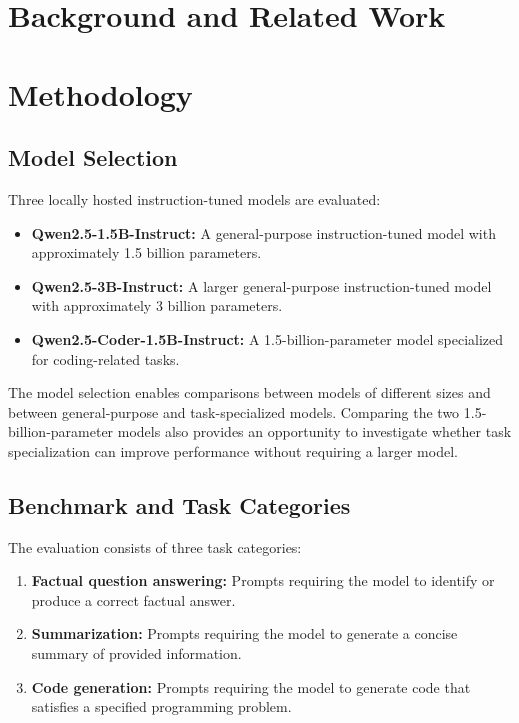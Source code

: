 \documentclass[conference]{IEEEtran}
\begin{document}
\section{Background and Related Work}

\section{Methodology}

\subsection{Model Selection}

Three locally hosted instruction-tuned models are evaluated:

\begin{itemize}
    \item \textbf{Qwen2.5-1.5B-Instruct:} A general-purpose
    instruction-tuned model with approximately 1.5 billion parameters.
    \item \textbf{Qwen2.5-3B-Instruct:} A larger general-purpose
    instruction-tuned model with approximately 3 billion parameters.
    \item \textbf{Qwen2.5-Coder-1.5B-Instruct:} A 1.5-billion-parameter
    model specialized for coding-related tasks.
\end{itemize}

The model selection enables comparisons between models of different
sizes and between general-purpose and task-specialized models.
Comparing the two 1.5-billion-parameter models also provides an
opportunity to investigate whether task specialization can improve
performance without requiring a larger model.

\subsection{Benchmark and Task Categories}

The evaluation consists of three task categories:

\begin{enumerate}
    \item \textbf{Factual question answering:} Prompts requiring the
    model to identify or produce a correct factual answer.
    \item \textbf{Summarization:} Prompts requiring the model to
    generate a concise summary of provided information.
    \item \textbf{Code generation:} Prompts requiring the model to
    generate code that satisfies a specified programming problem.
\end{enumerate}
\end{document}
